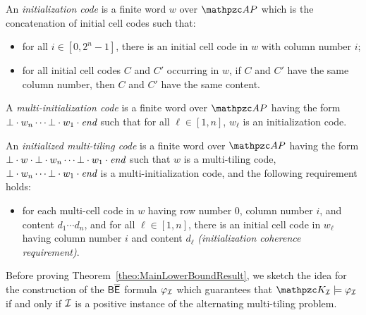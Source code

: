 \begin{definition}\label{Def:InitializationCodes} An \emph{initialization code} is a finite word $w$ over $\Prop$ which is the concatenation of initial cell codes such that:
\begin{itemize}
  \item for all $i \in [0,2^{n}-1]$, there is an initial cell code in $w$  with column number $i$; 
  \item for all initial cell codes $C$ and $C'$ occurring in $w$, if $C$ and $C'$ have the same  column number, then $C$ and $C'$ have the same content.
\end{itemize}
A \emph{multi-initialization code} is a finite word over $\Prop$ having the form $\bot\cdot w_n\cdots \bot \cdot w_1\cdot \textit{end}$
such that for all $\ell\in [1,n]$, $w_\ell$ is an initialization code.
\end{definition}

\begin{definition}\label{Def:IMTCodes} An \emph{initialized multi-tiling code} is a finite word over $\Prop$ having the form
$\bot \cdot w \cdot \bot\cdot w_n\cdots \bot \cdot w_1\cdot \textit{end}$
such that $w$ is a multi-tiling code, $\bot\cdot w_n\cdots \bot \cdot w_1\cdot \textit{end}$ is a multi-initialization code, and the following requirement holds:
\begin{itemize}
  \item for each multi-cell code in $w$ having row number $0$, column number $i$, and content $d_1\cdots d_n$, and for all $\ell\in [1,n]$, there is
  an initial cell code in $w_\ell$ having column number $i$ and content $d_\ell$  \emph{(initialization coherence requirement)}.
\end{itemize}
\end{definition}

Before proving Theorem~\ref{theo:MainLowerBoundResult},
we sketch the idea for the construction of the $\mathsf{B}\mathsf{\overline{E}}$ formula $\varphi_{\mathcal{I}}$ which guarantees that $\Ku_\Instance\models \varphi_\Instance$ if and only if $\mathcal{I}$ is a positive instance of the alternating multi-tiling problem. 

